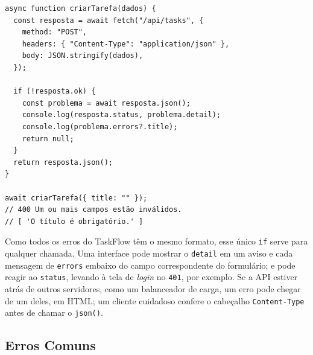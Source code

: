\begin{codigo}
\begin{Verbatim}[breaklines=true, breaksymbolleft={}, fontsize=\footnotesize]
async function criarTarefa(dados) {
  const resposta = await fetch("/api/tasks", {
    method: "POST",
    headers: { "Content-Type": "application/json" },
    body: JSON.stringify(dados),
  });

  if (!resposta.ok) {
    const problema = await resposta.json();
    console.log(resposta.status, problema.detail);
    console.log(problema.errors?.title);
    return null;
  }
  return resposta.json();
}

await criarTarefa({ title: "" });
// 400 Um ou mais campos estão inválidos.
// [ 'O título é obrigatório.' ]
\end{Verbatim}
\end{codigo}

Como todos os erros do TaskFlow têm o mesmo formato, esse único \texttt{if} serve para qualquer chamada. Uma interface pode mostrar o \texttt{detail} em um aviso e cada mensagem de \texttt{errors} embaixo do campo correspondente do formulário; e pode reagir ao \texttt{status}, levando à tela de \textit{login} no \texttt{401}, por exemplo. Se a API estiver atrás de outros servidores, como um balanceador de carga, um erro pode chegar de um deles, em HTML; um cliente cuidadoso confere o cabeçalho \texttt{Content-Type} antes de chamar o \texttt{json()}.

\subsection{Erros Comuns}

